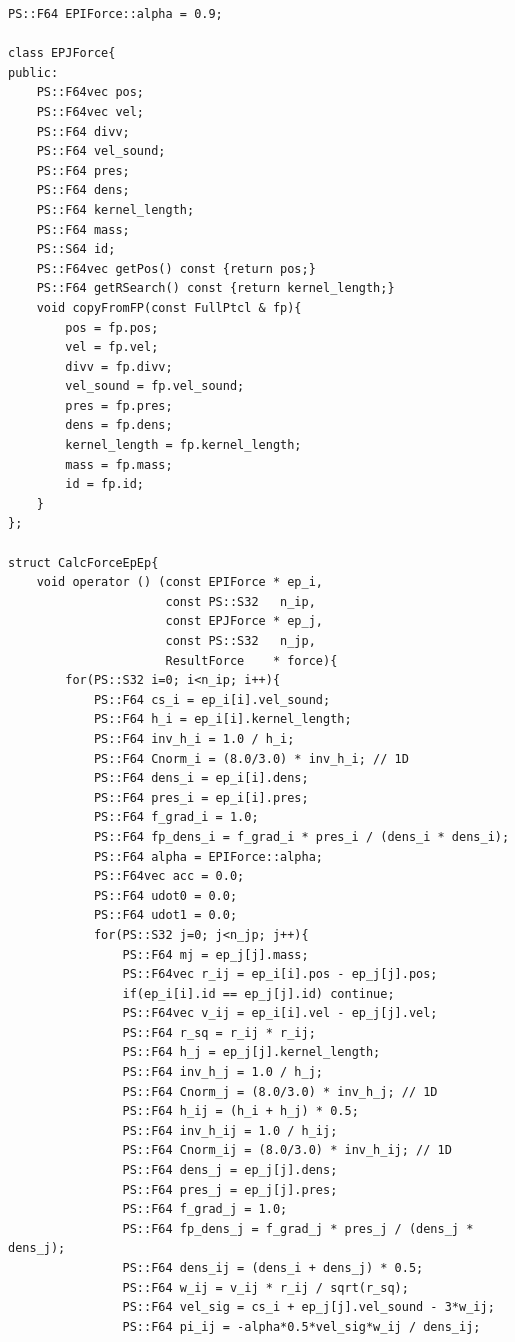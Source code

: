 \begin{lstlisting}[caption=SPHサンプル使用]
PS::F64 EPIForce::alpha = 0.9;

class EPJForce{
public:
    PS::F64vec pos;
    PS::F64vec vel;
    PS::F64 divv;
    PS::F64 vel_sound;
    PS::F64 pres;
    PS::F64 dens;
    PS::F64 kernel_length;
    PS::F64 mass;
    PS::S64 id;
    PS::F64vec getPos() const {return pos;}
    PS::F64 getRSearch() const {return kernel_length;}
    void copyFromFP(const FullPtcl & fp){
        pos = fp.pos;
        vel = fp.vel;
        divv = fp.divv;
        vel_sound = fp.vel_sound;
        pres = fp.pres;
        dens = fp.dens;
        kernel_length = fp.kernel_length;
        mass = fp.mass;
        id = fp.id;
    }
};

struct CalcForceEpEp{
    void operator () (const EPIForce * ep_i,
                      const PS::S32   n_ip,
                      const EPJForce * ep_j,
                      const PS::S32   n_jp,
                      ResultForce    * force){
        for(PS::S32 i=0; i<n_ip; i++){
            PS::F64 cs_i = ep_i[i].vel_sound;
            PS::F64 h_i = ep_i[i].kernel_length;
            PS::F64 inv_h_i = 1.0 / h_i;
            PS::F64 Cnorm_i = (8.0/3.0) * inv_h_i; // 1D
            PS::F64 dens_i = ep_i[i].dens;
            PS::F64 pres_i = ep_i[i].pres;
            PS::F64 f_grad_i = 1.0;
            PS::F64 fp_dens_i = f_grad_i * pres_i / (dens_i * dens_i);
            PS::F64 alpha = EPIForce::alpha;
            PS::F64vec acc = 0.0;
            PS::F64 udot0 = 0.0;
            PS::F64 udot1 = 0.0;
            for(PS::S32 j=0; j<n_jp; j++){
                PS::F64 mj = ep_j[j].mass;
                PS::F64vec r_ij = ep_i[i].pos - ep_j[j].pos;
                if(ep_i[i].id == ep_j[j].id) continue;
                PS::F64vec v_ij = ep_i[i].vel - ep_j[j].vel;
                PS::F64 r_sq = r_ij * r_ij;
                PS::F64 h_j = ep_j[j].kernel_length;
                PS::F64 inv_h_j = 1.0 / h_j;
                PS::F64 Cnorm_j = (8.0/3.0) * inv_h_j; // 1D
                PS::F64 h_ij = (h_i + h_j) * 0.5;
                PS::F64 inv_h_ij = 1.0 / h_ij;
                PS::F64 Cnorm_ij = (8.0/3.0) * inv_h_ij; // 1D
                PS::F64 dens_j = ep_j[j].dens;
                PS::F64 pres_j = ep_j[j].pres;
                PS::F64 f_grad_j = 1.0;
                PS::F64 fp_dens_j = f_grad_j * pres_j / (dens_j * dens_j);
                PS::F64 dens_ij = (dens_i + dens_j) * 0.5;
                PS::F64 w_ij = v_ij * r_ij / sqrt(r_sq);
                PS::F64 vel_sig = cs_i + ep_j[j].vel_sound - 3*w_ij;
                PS::F64 pi_ij = -alpha*0.5*vel_sig*w_ij / dens_ij;

\end{lstlisting}

